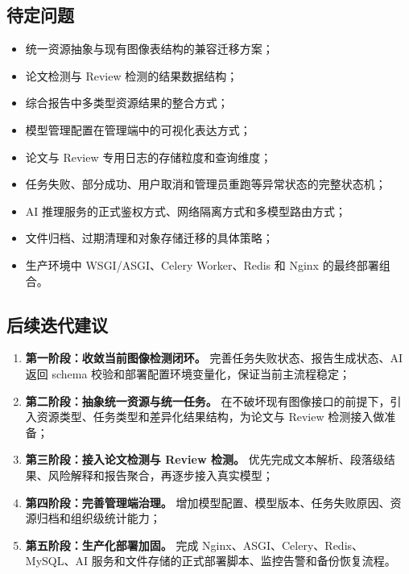 \subsection{待定问题}
\begin{itemize}[leftmargin=2em]
    \item 统一资源抽象与现有图像表结构的兼容迁移方案；
    \item 论文检测与 Review 检测的结果数据结构；
    \item 综合报告中多类型资源结果的整合方式；
    \item 模型管理配置在管理端中的可视化表达方式；
    \item 论文与 Review 专用日志的存储粒度和查询维度；
    \item 任务失败、部分成功、用户取消和管理员重跑等异常状态的完整状态机；
    \item AI 推理服务的正式鉴权方式、网络隔离方式和多模型路由方式；
    \item 文件归档、过期清理和对象存储迁移的具体策略；
    \item 生产环境中 WSGI/ASGI、Celery Worker、Redis 和 Nginx 的最终部署组合。
\end{itemize}

\subsection{后续迭代建议}
\begin{enumerate}[leftmargin=2em]
    \item \textbf{第一阶段：收敛当前图像检测闭环。} 完善任务失败状态、报告生成状态、AI 返回 schema 校验和部署配置环境变量化，保证当前主流程稳定；
    \item \textbf{第二阶段：抽象统一资源与统一任务。} 在不破坏现有图像接口的前提下，引入资源类型、任务类型和差异化结果结构，为论文与 Review 检测接入做准备；
    \item \textbf{第三阶段：接入论文检测与 Review 检测。} 优先完成文本解析、段落级结果、风险解释和报告聚合，再逐步接入真实模型；
    \item \textbf{第四阶段：完善管理端治理。} 增加模型配置、模型版本、任务失败原因、资源归档和组织级统计能力；
    \item \textbf{第五阶段：生产化部署加固。} 完成 Nginx、ASGI、Celery、Redis、MySQL、AI 服务和文件存储的正式部署脚本、监控告警和备份恢复流程。
\end{enumerate}

